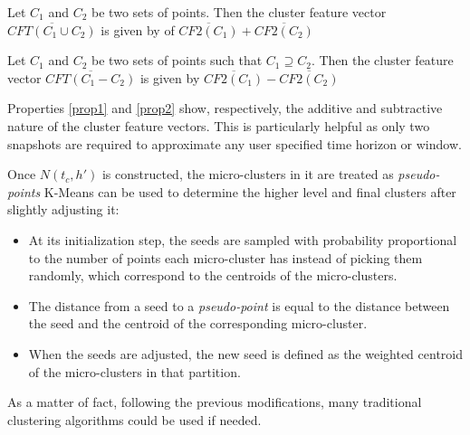 \begin{property}\label{prop1}
 Let $C_1$ and $C_2$ be two sets of points. Then the cluster feature vector $\overline{CFT(C_1 \cup C_2)}$ is given by of $\overline{CF2(C_1)} + \overline{CF2(C_2)}$
\end{property}

\begin{property}\label{prop2}
 Let $C_1$ and $C_2$ be two sets of points such that $C_1 \supseteq C_2$. Then the cluster feature vector $\overline{CFT(C_1 - C_2)}$ is given by $\overline{CF2(C_1)} - \overline{CF2(C_2)}$
\end{property}

Properties \ref{prop1} and \ref{prop2} show, respectively, the additive and subtractive nature of the cluster feature vectors. This is particularly helpful as only two snapshots are required to approximate any user specified time horizon or window.

Once $N(t_c,h')$ is constructed, the micro-clusters in it are treated as \textit{pseudo-points} K-Means can be used to determine the higher level and final clusters after slightly adjusting it:

\begin{itemize}
 \item At its initialization step, the seeds are sampled with probability proportional to the number of points each micro-cluster has instead of picking them randomly, which correspond to the centroids of the micro-clusters.
 \item The distance from a seed to a \textit{pseudo-point} is equal to the distance between the seed and the centroid of the corresponding micro-cluster.
 \item When the seeds are adjusted, the new seed is defined as the weighted centroid of the micro-clusters in that partition.
\end{itemize}

As a matter of fact, following the previous modifications, many traditional clustering algorithms could be used if needed.
